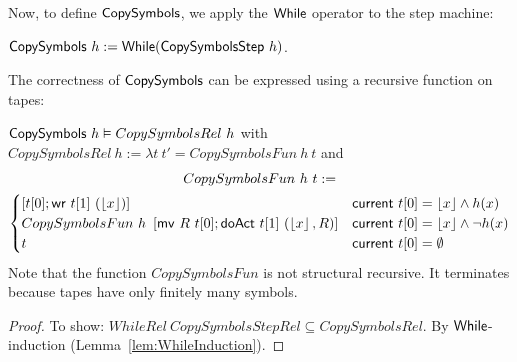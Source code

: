 Now, to define $\MS{CopySymbols}$, we apply the $\mathsf{While}$ operator to the step machine:
\begin{definition}[$\MS{CopySymbols}$]
  \label{def:CopySymbols}
  $\mathsf{CopySymbols}~h := \mathsf{While}(\mathsf{CopySymbolsStep}~h)$.
\end{definition}

The correctness of $\MS{CopySymbols}$ can be expressed using a recursive function on tapes:
\begin{lemma}
  \label{lem:CopySymbols_Realise}
  $\mathsf{CopySymbols}~h \mathrel{\vDash} CopySymbolsRel~h$
  with $CopySymbolsRel~h := \lambda t~t' = CopySymbolsFun~h~t$ and
  {
    \small
    \begin{multline*}
      CopySymbolsFun~h~t :=\\
      \begin{cases}
        \left[ t[0]; \mathsf{wr}~t[1]~(\left\lfloor {x} \right\rfloor) \right]                                  & \mathsf{current}~t[0]=\left\lfloor {x} \right\rfloor \land h(x) \\
        CopySymbolsFun~h~\left[ \mathsf{mv}~R~t[0]; \mathsf{doAct}~t[1]~(\left\lfloor {x} \right\rfloor, R) \right] & \mathsf{current}~t[0]=\left\lfloor {x} \right\rfloor \land \lnot h(x) \\
        t                                                                       & \mathsf{current}~t[0]=\emptyset
      \end{cases}
    \end{multline*}
  }
  Note that the function $CopySymbolsFun$ is not structural recursive.  It terminates because tapes have only finitely many symbols.
\end{lemma}
\begin{proof}
  To show: $WhileRel~CopySymbolsStepRel \subseteq CopySymbolsRel$.  By $\mathsf{While}$-induction (Lemma~\ref{lem:WhileInduction}).
\end{proof}

